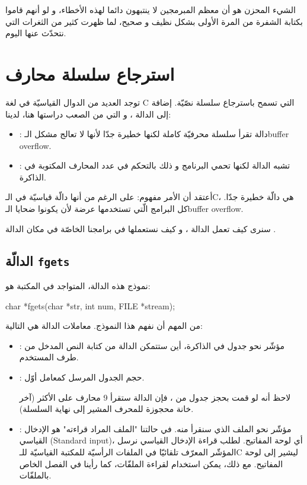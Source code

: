 الشيء المحزن هو أن معظم المبرمجين لا ينتبهون دائما لهذه الأخطاء، و لو أنهم قاموا بكتابة الشفرة من المرة الأولى بشكل نظيف و صحيح، لما ظهرت كثير من الثغرات التي نتحدّث عنها اليوم.

\section{استرجاع سلسلة محارف}

توجد العديد من الدوال القياسيّة في لغة
\textenglish{C}
التي تسمح باسترجاع سلسلة نصّيّة. إضافة إلى الدالة
،
و التي من الصعب دراستها هنا، لدينا:

\begin{itemize}
  \item {}:
دالة تقرأ سلسلة محرفيّة كاملة لكنها خطيرة جدّا لأنها لا تعالج مشكل الـ\textenglish{buffer overflow}.
  \item {} :
 تشبه الدالة
لكنها تحمي البرنامج و ذلك بالتحكم في عدد المحارف المكتوبة في الذاكرة.
\end{itemize}

أعتقد أن الأمر مفهوم: على الرغم من أنها دالّة قياسيّة في الـ\textenglish{C}،
هي دالّة خطيرة  جدّا. كل البرامج الّتي تستخدمها عرضة لأن يكونوا ضحايا الـ\textenglish{buffer overflow}.

سنرى كيف تعمل الدالة
،
و كيف نستعملها في برامجنا الخاصّة في مكان الدالة
.

\subsection{الدالّة \texttt{fgets}}

نموذج هذه الدالة، المتواجد في المكتبة
هو:

\begin{Csource}
char *fgets(char *str, int num, FILE *stream);
\end{Csource}

من المهم أن نفهم هذا النموذج. معاملات الدالة هي التالية:

\begin{itemize}
  \item {} :
مؤشّر نحو جدول في الذاكرة، أين ستتمكن الدالة من كتابة النص المدخل من طرف المستخدم.
  \item {} :
حجم الجدول
المرسل كمعامل أوّل.

لاحظ أنه لو قمت بحجز جدول من
،
فإن الدالة
ستقرأ 9 محارف على الأكثر (آخر خانة محجوزة للمحرف
المشير إلى نهاية السلسلة).
  \item {} :
مؤشّر نحو الملف الذي سنقرأ منه. في حالتنا "الملف المراد قراءته" هو الإدخال القياسي
(\textenglish{Standard input})،
أي لوحة المفاتيح. لطلب قراءة الإدخال القياسي نرسل المؤشّر
المعرّف تلقائيّا في الملفات الرأسيّة للمكتبة القياسيّة للـ\textenglish{C}
ليشير إلى لوحة المفاتيح. مع ذلك، يمكن استخدام
لقراءة الملفّات، كما رأينا في الفصل الخاص بالملفّات.
\end{itemize}

